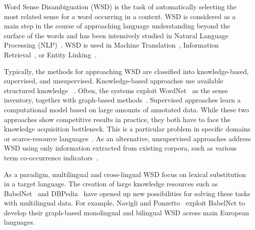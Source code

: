 Word Sense Disambiguation (WSD) is the task of automatically  selecting the most related sense for a word occurring in a context. WSD is considered as a main step in the course of approaching language understanding beyond the surface of the words and has been intensively studied in Natural Language Processing (NLP)~\cite{navigli2012quick}. WSD is used in Machine Translation~\cite{chan2007word,costa2014statistical}, Information Retrieval~\cite{zhong2012word,na2011enriching}, or Entity Linking~\cite{moro2014entity}.

Typically, the methods for approaching WSD are classified into knowledge-based, supervised, and unsupervised. Knowledge-based approaches use available structured knowledge%
~\cite{agirre2014random,miller2012using}. Often, the systems exploit WordNet~\cite{fellbaum1998wordnet} as the sense inventory, together with graph-based methods~\cite{agirre2010graph,guo2010combining}.
Supervised approaches learn a computational model based on large amounts of annotated data. While these two approaches show competitive results in practice, they both have to face the knowledge acquisition bottleneck. This is a particular problem in specific domains or scarce-resource languages~\cite{pilehvar2014large}. As an alternative, unsupervised approaches address WSD using only information extracted from existing corpora, such as various term co-occurrence indicators~\cite{di2013clustering}.

As a paradigm, multilingual and cross-lingual WSD focus on lexical substitution in a target language. The creation of large knowledge resources such as BabelNet~\cite{navigli2010babelnet} and DBPedia~\cite{auer2007dbpedia} have opened up new possibilities for solving these tasks with multilingual data. For example, Navigli and Ponzetto~ exploit BabelNet to develop their graph-based monolingual and bilingual WSD across main European languages.

